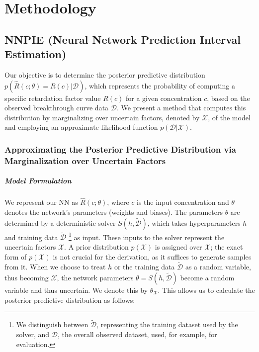 \chapter{Methodology}
\label{sec:methodology}
\section{NNPIE (Neural Network Prediction Interval Estimation)}
Our objective is to determine the posterior predictive distribution $p(\hat{R}(c;\theta) = R(c)| \mathcal{D})$, which represents the probability of computing a specific retardation factor value $R(c)$ for a given concentration $c$, based on the observed breakthrough curve data $\mathcal{D}$. We present a method that computes this distribution by marginalizing over uncertain factors, denoted by $\mathcal{X}$, of the model and employing an approximate likelihood function $p(\mathcal{D} | \mathcal{X})$.

\subsection{Approximating the Posterior Predictive Distribution via Marginalization over Uncertain Factors}

\paragraph{Model Formulation}
We represent our NN as $\hat{R}(c;\theta)$, where $c$ is the input concentration and $\theta$ denotes the network's parameters (weights and biases). The parameters $\theta$ are determined by a deterministic solver $S(h, \tilde{\mathcal{D}})$, which takes hyperparameters $h$ and training data $\tilde{\mathcal{D}}$ \footnote{We distinguish between $\tilde{\mathcal{D}}$, representing the training dataset used by the solver, and $\mathcal{D}$, the overall observed dataset, used, for example, for evaluation.} as input. These inputs to the solver represent the uncertain factors $\mathcal{X}$. A prior distribution $p(\mathcal{X})$ is assigned over $\mathcal{X}$; the exact form of $p(\mathcal{X})$ is not crucial for the derivation, as it suffices to generate samples from it.
When we choose to treat $h$ or the training data $\tilde{\mathcal{D}}$ as a random variable, thus becoming $\mathcal{X}$, the network parameters $\theta = S(h, \tilde{\mathcal{D}})$ become a random variable and thus uncertain. We denote this by $\theta_{\mathcal{X}}$.
This allows us to calculate the posterior predictive distribution as follows:


